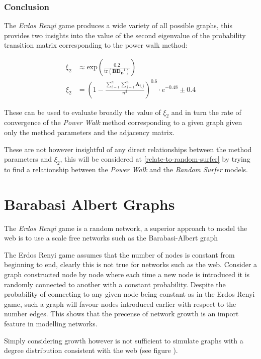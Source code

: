 \documentclass[11pt]{article}
\begin{document}
\subsubsection{Conclusion}
\label{sec:orgf29a3bd}
The \emph{Erdos Renyi} game produces a wide variety of all possible graphs, this provides two insights into the value of the second eigenvalue of the probability transition matrix corresponding to the power walk method:


\begin{align}
\xi_{2} &\approx  \mathrm{exp} \left( \frac{0.2}{\mathrm{tr}\left( \mathbf{B}\mathbf{D}_{\mathbf{B}}^{- 1} \right)} \right) \\
    \xi_2 &= \left( 1-  \frac{\sum^{n}_{i= 1} \sum^{n}_{j= 1}   \mathbf{A}_{i,j}  }{n^{2}} \right)^{0.6} \cdot  e^{- 0.48} \pm 0.4
\end{align}

These can be used to evaluate broadly the value of \(\xi_{2}\) and in turn the
rate of convergence of the \emph{Power Walk} method corresponding to a given graph
given only the method parameters and the adjacency matrix.

These are not however insightful of any direct relationships between the method parameters and \(\xi_{2}\), this will be considered at \ref{relate-to-random-surfer} by trying to find a relationship between the \emph{Power Walk} and the \emph{Random Surfer} models.

\section{Barabasi Albert Graphs}
\label{barabassi-albert}
The \emph{Erdos Renyi} game is a random network, a superior approach to model the web
is to use a scale free networks \cite{barabasiPhysicsWeb2001} such as the
Barabasi-Albert graph \cite{barabasiScalefreeCharacteristicsRandom2000}

The Erdos Renyi game assumes that the number of nodes is constant from beginning
to end, clearly this is not true for networks such as the web. Consider a graph
constructed node by node where each time a new node is introduced it is randomly
connected to another with a constant probability. Despite the probability of
connecting to any given node being constant as in the Erdos Renyi game, such a
graph will favour nodes introduced earlier with respect to the number edges.
This shows that the precense of network growth is an import feature in modelling
networks.

Simply considering growth however is not sufficient to simulate graphs with a
degree distribution consistent with the web
\cite[Ch. 7]{zengPracticalSimulationMethod2013} (see figure ).
\end{document}

